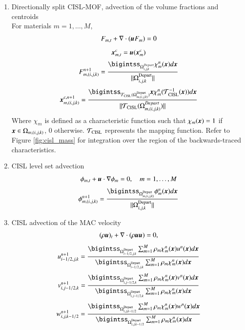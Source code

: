 \documentclass[preprint,12pt]{Definitions/elsarticle}
\newcommand{\tn}{\textnormal}
\newcommand{\bmu}{\mbox{\boldmath $u$\unboldmath}}
\newcommand{\bmx}{\mbox{\boldmath $x$\unboldmath}}
\begin{document}
\begin{enumerate}
	\item Directionally split CISL-MOF, advection of the volume fractions and centroids\\
	For materials $m=1, \ldots, M$,
	\begin{equation}
	F_{m,t}+\nabla\cdot(\bmu F_{m})=0
	\end{equation}
	\begin{equation}
	\bmx_{m,t}^c=\bmu(\bmx_{m}^c)
	\end{equation}
	\begin{equation}
	F_{m,(i,j,k)}^{n+1}=
	\frac{\bigintss_{\Omega_{i,j,k}^{Depart}} \chi_m^{n}(\bmx)d\bmx }
	{||\Omega_{i,j,k}^\tn{Depart}||} 		
	\end{equation}
	\begin{equation}
	\bmx_{m,(i,j,k)}^{c,n+1}=
	\frac{\bigintss_{\mathcal{T}_\tn{CISL}(\Omega_{m,(i,j,k)}^\tn{Depart})} 
		\bmx\chi_m^{n}(\mathcal{T}_\tn{CISL}^{-1}(\bmx)) d\bmx}
	{||\mathcal{T}_\tn{CISL}(\Omega_{m,(i,j,k)}^{Depart})||}
	\end{equation}
	Where $\displaystyle \chi_m$ is defined as a characteristic function such that $\chi_m(\bmx) = 1$ if $\bmx \in \Omega_{m,(i,j,k)}$, $0$ otherwise. $\mathcal{T}_\tn{CISL}$ represents the mapping function. Refer to Figure \ref{fig:cisl_mass} for integration over the region of the backwards-traced characteristics.
	
	\item CISL level set advection
	\begin{equation}
	\phi_{m,t}+\bmu\cdot\nabla\phi_{m}=0, \hspace{10pt} 
	m=1,\ldots,M 
	\end{equation}
	\begin{equation}
	\phi_{m,(i,j,k)}^{n+1}=
	\frac{\bigintss_{\Omega_{m,(i,j,k)}^\tn{Depart}} \phi_m^{n}(\bmx) d\bmx}
	{||\Omega_{i,j,k}^\tn{Depart}||}
	\end{equation}
	\item CISL advection of the MAC velocity 
	\begin{equation}
	(\rho \bmu)_{t}+\nabla\cdot(\rho\bmu\bmu)=0, \label{advection}
	\end{equation}
	\begin{equation}
	u_{i-1/2,j,k}^{n+1}=
	\frac{\bigintss_{\Omega_{i-1/2,j,k}^\tn{Depart}}
		\sum_{m=1}^{M} \rho_{m}\chi_m^{n}(\bmx)u^{n}(\bmx) d\bmx}
	{\bigintss_{\Omega_{i-1/2,j,k}^\tn{Depart}}
		\sum_{m=1}^{M} \rho_{m}\chi_m^{n}(\bmx) d\bmx}
	\end{equation}
	\begin{equation}
	v_{i,j-1/2,k}^{n+1}=
	\frac{\bigintss_{\Omega_{i,j-1/2,k}^\tn{Depart}}
		\sum_{m=1}^{M} \rho_{m}\chi_m^{n}(\bmx)v^{n}(\bmx) d\bmx}
	{\bigintss_{\Omega_{i,j-1/2,k}^\tn{Depart}}
		\sum_{m=1}^{M} \rho_{m}\chi_m^{n}(\bmx) d\bmx}
	\end{equation}
	\begin{equation}
	w_{i,j,k-1/2}^{n+1}=
	\frac{\bigintss_{\Omega_{i,j,k-1/2}^\tn{Depart}}
		\sum_{m=1}^{M} \rho_{m}\chi_m^{n}(\bmx)w^{n}(\bmx) d\bmx}
	{\bigintss_{\Omega_{i,j,k-1/2}^\tn{Depart}}
		\sum_{m=1}^{M} \rho_{m}\chi_m^{n}(\bmx) d\bmx}
	\end{equation}
	

\end{enumerate}
\end{document}
